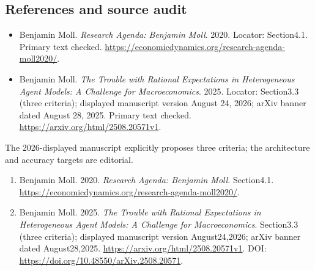 \documentclass[11pt,a4paper]{article}
\begin{document}
\subsection*{References and source audit}
\begin{itemize}
\item Benjamin Moll. \emph{Research Agenda: Benjamin Moll}. 2020. Locator: Section4.1. Primary text checked. \url{https://economicdynamics.org/research-agenda-moll2020/}.
\item Benjamin Moll. \emph{The Trouble with Rational Expectations in Heterogeneous Agent Models: A Challenge for Macroeconomics}. 2025. Locator: Section3.3 (three criteria); displayed manuscript version August 24, 2026; arXiv banner dated August 28, 2025. Primary text checked. \url{https://arxiv.org/html/2508.20571v1}.
\end{itemize}
The 2026-displayed manuscript explicitly proposes three criteria; the architecture and accuracy targets are editorial.
\begin{enumerate}\raggedright
\item\hypertarget{definitions:source:30007514:1}{} Benjamin Moll. 2020. \emph{Research Agenda: Benjamin Moll}. Section4.1.
\url{https://economicdynamics.org/research-agenda-moll2020/}.
\item\hypertarget{definitions:source:30007514:2}{} Benjamin Moll. 2025. \emph{The Trouble with Rational Expectations in Heterogeneous Agent Models: A Challenge for Macroeconomics}. Section3.3 (three criteria); displayed manuscript version August24,2026; arXiv banner dated August28,2025.
\url{https://arxiv.org/html/2508.20571v1}.
DOI: \url{https://doi.org/10.48550/arXiv.2508.20571}.
\end{enumerate}
\end{document}
